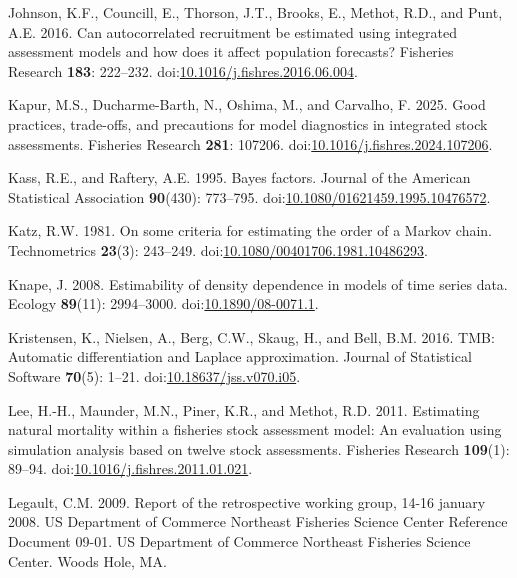 \begin{CSLReferences}{1}{0}
Johnson, K.F., Councill, E., Thorson, J.T., Brooks, E., Methot, R.D.,
and Punt, A.E. 2016. Can autocorrelated recruitment be estimated using
integrated assessment models and how does it affect population
forecasts? Fisheries Research \textbf{183}: 222--232.
doi:\href{https://doi.org/10.1016/j.fishres.2016.06.004}{10.1016/j.fishres.2016.06.004}.

Kapur, M.S., Ducharme-Barth, N., Oshima, M., and Carvalho, F. 2025. Good
practices, trade-offs, and precautions for model diagnostics in
integrated stock assessments. Fisheries Research \textbf{281}: 107206.
doi:\href{https://doi.org/10.1016/j.fishres.2024.107206}{10.1016/j.fishres.2024.107206}.

Kass, R.E., and Raftery, A.E. 1995. Bayes factors. Journal of the
American Statistical Association \textbf{90}(430): 773--795.
doi:\href{https://doi.org/10.1080/01621459.1995.10476572}{10.1080/01621459.1995.10476572}.

Katz, R.W. 1981. On some criteria for estimating the order of a {M}arkov
chain. Technometrics \textbf{23}(3): 243--249.
doi:\href{https://doi.org/10.1080/00401706.1981.10486293}{10.1080/00401706.1981.10486293}.

Knape, J. 2008. Estimability of density dependence in models of time
series data. Ecology \textbf{89}(11): 2994--3000.
doi:\href{https://doi.org/10.1890/08-0071.1}{10.1890/08-0071.1}.

Kristensen, K., Nielsen, A., Berg, C.W., Skaug, H., and Bell, B.M. 2016.
{TMB}: Automatic differentiation and {L}aplace approximation. Journal of
Statistical Software \textbf{70}(5): 1--21.
doi:\href{https://doi.org/10.18637/jss.v070.i05}{10.18637/jss.v070.i05}.

Lee, H.-H., Maunder, M.N., Piner, K.R., and Methot, R.D. 2011.
Estimating natural mortality within a fisheries stock assessment model:
An evaluation using simulation analysis based on twelve stock
assessments. Fisheries Research \textbf{109}(1): 89--94.
doi:\href{https://doi.org/10.1016/j.fishres.2011.01.021}{10.1016/j.fishres.2011.01.021}.

Legault, C.M. 2009. Report of the retrospective working group, 14-16
january 2008. US Department of Commerce Northeast Fisheries Science
Center Reference Document 09-01. US Department of Commerce Northeast
Fisheries Science Center. Woods Hole, MA.


\end{CSLReferences}
